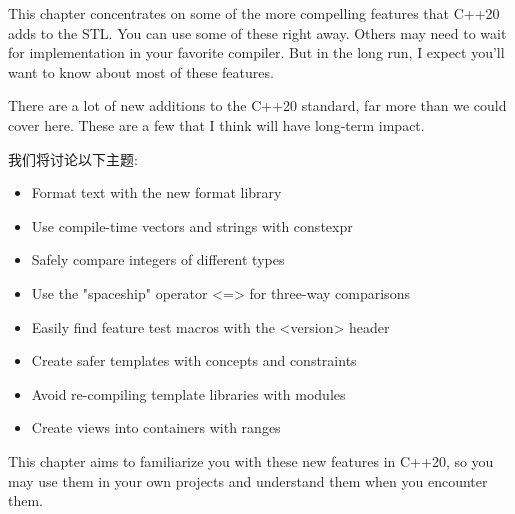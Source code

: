 
This chapter concentrates on some of the more compelling features that C++20 adds to the STL. You can use some of these right away. Others may need to wait for implementation in your favorite compiler. But in the long run, I expect you'll want to know about most of these features.

There are a lot of new additions to the C++20 standard, far more than we could cover here. These are a few that I think will have long-term impact.

我们将讨论以下主题:

\begin{itemize}
\item 
Format text with the new format library

\item 
Use compile-time vectors and strings with constexpr

\item 
Safely compare integers of different types

\item 
Use the "spaceship" operator <=> for three-way comparisons

\item 
Easily find feature test macros with the <version> header

\item 
Create safer templates with concepts and constraints

\item 
Avoid re-compiling template libraries with modules

\item 
Create views into containers with ranges
\end{itemize}

This chapter aims to familiarize you with these new features in C++20, so you may use them in your own projects and understand them when you encounter them.


